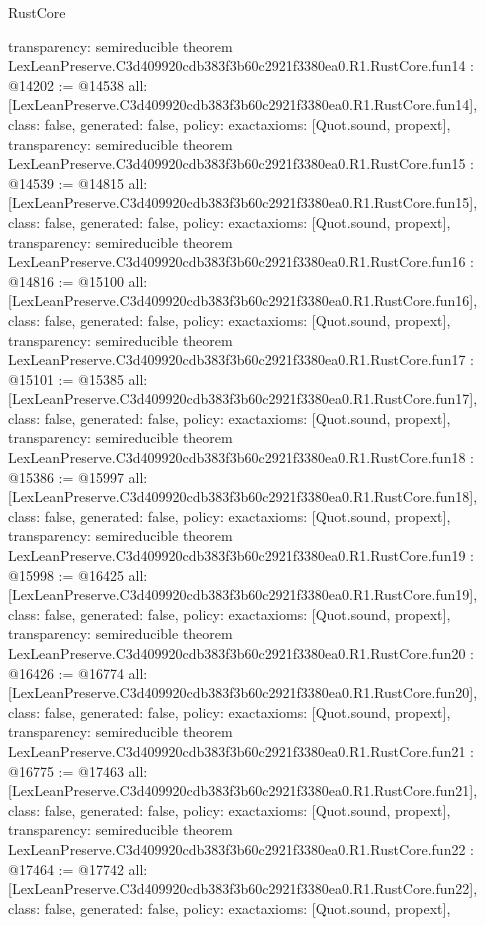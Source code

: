 \begin{lexlean}{RustCore}
\begin{coremodule}
{  transparency: semireducible
}
theorem LexLeanPreserve.C3d409920cdb383f3b60c2921f3380ea0.R1.RustCore.fun14 : @14202 := @14538 {
  all: [LexLeanPreserve.C3d409920cdb383f3b60c2921f3380ea0.R1.RustCore.fun14],
  class: false,
  generated: false,
  policy: exact{axioms: [Quot.sound, propext]},
  transparency: semireducible
}
theorem LexLeanPreserve.C3d409920cdb383f3b60c2921f3380ea0.R1.RustCore.fun15 : @14539 := @14815 {
  all: [LexLeanPreserve.C3d409920cdb383f3b60c2921f3380ea0.R1.RustCore.fun15],
  class: false,
  generated: false,
  policy: exact{axioms: [Quot.sound, propext]},
  transparency: semireducible
}
theorem LexLeanPreserve.C3d409920cdb383f3b60c2921f3380ea0.R1.RustCore.fun16 : @14816 := @15100 {
  all: [LexLeanPreserve.C3d409920cdb383f3b60c2921f3380ea0.R1.RustCore.fun16],
  class: false,
  generated: false,
  policy: exact{axioms: [Quot.sound, propext]},
  transparency: semireducible
}
theorem LexLeanPreserve.C3d409920cdb383f3b60c2921f3380ea0.R1.RustCore.fun17 : @15101 := @15385 {
  all: [LexLeanPreserve.C3d409920cdb383f3b60c2921f3380ea0.R1.RustCore.fun17],
  class: false,
  generated: false,
  policy: exact{axioms: [Quot.sound, propext]},
  transparency: semireducible
}
theorem LexLeanPreserve.C3d409920cdb383f3b60c2921f3380ea0.R1.RustCore.fun18 : @15386 := @15997 {
  all: [LexLeanPreserve.C3d409920cdb383f3b60c2921f3380ea0.R1.RustCore.fun18],
  class: false,
  generated: false,
  policy: exact{axioms: [Quot.sound, propext]},
  transparency: semireducible
}
theorem LexLeanPreserve.C3d409920cdb383f3b60c2921f3380ea0.R1.RustCore.fun19 : @15998 := @16425 {
  all: [LexLeanPreserve.C3d409920cdb383f3b60c2921f3380ea0.R1.RustCore.fun19],
  class: false,
  generated: false,
  policy: exact{axioms: [Quot.sound, propext]},
  transparency: semireducible
}
theorem LexLeanPreserve.C3d409920cdb383f3b60c2921f3380ea0.R1.RustCore.fun20 : @16426 := @16774 {
  all: [LexLeanPreserve.C3d409920cdb383f3b60c2921f3380ea0.R1.RustCore.fun20],
  class: false,
  generated: false,
  policy: exact{axioms: [Quot.sound, propext]},
  transparency: semireducible
}
theorem LexLeanPreserve.C3d409920cdb383f3b60c2921f3380ea0.R1.RustCore.fun21 : @16775 := @17463 {
  all: [LexLeanPreserve.C3d409920cdb383f3b60c2921f3380ea0.R1.RustCore.fun21],
  class: false,
  generated: false,
  policy: exact{axioms: [Quot.sound, propext]},
  transparency: semireducible
}
theorem LexLeanPreserve.C3d409920cdb383f3b60c2921f3380ea0.R1.RustCore.fun22 : @17464 := @17742 {
  all: [LexLeanPreserve.C3d409920cdb383f3b60c2921f3380ea0.R1.RustCore.fun22],
  class: false,
  generated: false,
  policy: exact{axioms: [Quot.sound, propext]},
}
\end{coremodule}
\end{lexlean}
